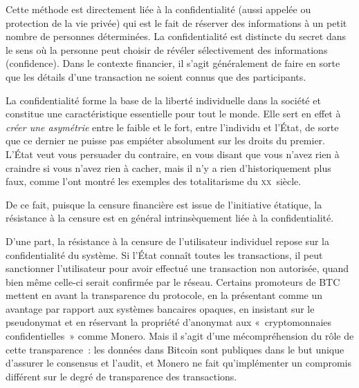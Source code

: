 Cette méthode est directement liée à la confidentialité (aussi appelée  ou protection de la vie privée) qui est le fait de réserver des informations à un petit nombre de personnes déterminées. La confidentialité est distincte du secret dans le sens où la personne peut choisir de révéler sélectivement des informations (confidence). Dans le contexte financier, il s'agit généralement de faire en sorte que les détails d'une transaction ne soient connus que des participants.

La confidentialité forme la base de la liberté individuelle dans la société et constitue une caractéristique essentielle pour tout le monde. Elle sert en effet à \emph{créer une asymétrie} entre le faible et le fort, entre l'individu et l'État, de sorte que ce dernier ne puisse pas empiéter absolument sur les droits du premier. L'État veut vous persuader du contraire, en vous disant que vous n'avez rien à craindre si vous n'avez rien à cacher, mais il n'y a rien d'historiquement plus faux, comme l'ont montré les exemples des totalitarisme du \textsc{xx}\ieme{}~siècle.


De ce fait, puisque la censure financière est issue de l'initiative étatique, la résistance à la censure est en général intrinsèquement liée à la confidentialité.

D'une part, la résistance à la censure de l'utilisateur individuel repose sur la confidentialité du système. Si l'État connaît toutes les transactions, il peut sanctionner l'utilisateur pour avoir effectué une transaction non autorisée, quand bien même celle-ci serait confirmée par le réseau. Certains promoteurs de BTC mettent en avant la transparence du protocole, en la présentant comme un avantage par rapport aux systèmes bancaires opaques, en insistant sur le pseudonymat et en réservant la propriété d'anonymat aux «~cryptomonnaies confidentielles~» comme Monero. Mais il s'agit d'une mécompréhension du rôle de cette transparence~: les données dans Bitcoin sont publiques dans le but unique d'assurer le consensus et l'audit, et Monero ne fait qu'implémenter un compromis différent sur le degré de transparence des transactions.

